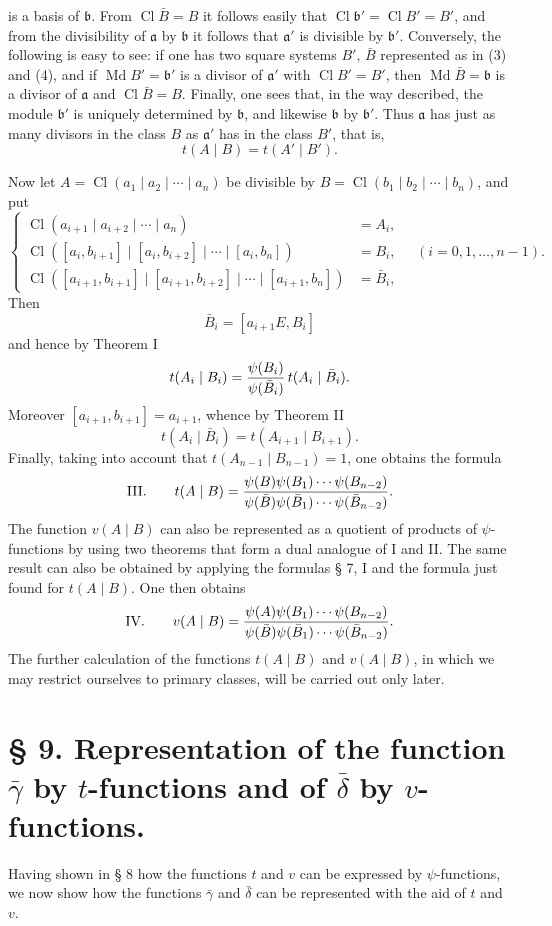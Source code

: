 \documentclass[11pt,a4paper]{article}
\newcommand{\Cl}{\operatorname{Cl}}
\newcommand{\Md}{\operatorname{Md}}
\begin{document}
is a basis of $\mathfrak b$. From $\Cl\bar B=B$ it follows easily that $\Cl\mathfrak b'=\Cl B'=B'$, and from the divisibility of $\mathfrak a$ by $\mathfrak b$ it follows that $\mathfrak a'$ is divisible by $\mathfrak b'$. Conversely, the following is easy to see: if one has two square systems $B'$, $\bar B$ represented as in (3) and (4), and if $\Md B'=\mathfrak b'$ is a divisor of $\mathfrak a'$ with $\Cl B'=B'$, then $\Md\bar B=\mathfrak b$ is a divisor of $\mathfrak a$ and $\Cl\bar B=B$. Finally, one sees that, in the way described, the module $\mathfrak b'$ is uniquely determined by $\mathfrak b$, and likewise $\mathfrak b$ by $\mathfrak b'$. Thus $\mathfrak a$ has just as many divisors in the class $B$ as $\mathfrak a'$ has in the class $B'$, that is,
\[
 t(A\mid B)=t(A'\mid B').
\]

Now let $A=\Cl(a_1\mid a_2\mid\cdots\mid a_n)$ be divisible by $B=\Cl(b_1\mid b_2\mid\cdots\mid b_n)$, and put
\begin{equation}
\left\{
\begin{aligned}
 \Cl(a_{i+1}\mid a_{i+2}\mid\cdots\mid a_n)&=A_i,\\
 \Cl([a_i,b_{i+1}]\mid[a_i,b_{i+2}]\mid\cdots\mid[a_i,b_n])&=B_i,\\
 \Cl([a_{i+1},b_{i+1}]\mid[a_{i+1},b_{i+2}]\mid\cdots\mid[a_{i+1},b_n])&=\bar B_i,
\end{aligned}
\right.
\quad (i=0,1,\ldots,n-1).
\tag{5}
\end{equation}
Then
\[
 \bar B_i=[a_{i+1}E,B_i]
\]
and hence by Theorem I
\[
 t(A_i\mid B_i)={\psi(B_i)\over\psi(\bar B_i)}\,t(A_i\mid\bar B_i).
\]
Moreover $[a_{i+1},b_{i+1}]=a_{i+1}$, whence by Theorem II
\[
 t(A_i\mid\bar B_i)=t(A_{i+1}\mid B_{i+1}).
\]
Finally, taking into account that $t(A_{n-1}\mid B_{n-1})=1$, one obtains the formula
\[
\text{III.}\qquad
 t(A\mid B)=
 {\psi(B)\psi(B_1)\cdots\psi(B_{n-2})
 \over
 \psi(\bar B)\psi(\bar B_1)\cdots\psi(\bar B_{n-2})}.
\]
The function $v(A\mid B)$ can also be represented as a quotient of products of $\psi$-functions by using two theorems that form a dual analogue of I and II. The same result can also be obtained by applying the formulas § 7, I and the formula just found for $t(A\mid B)$. One then obtains
\[
\text{IV.}\qquad
 v(A\mid B)=
 {\psi(A)\psi(B_1)\cdots\psi(B_{n-2})
 \over
 \psi(\bar B)\psi(\bar B_1)\cdots\psi(\bar B_{n-2})}.
\]
The further calculation of the functions $t(A\mid B)$ and $v(A\mid B)$, in which we may restrict ourselves to primary classes, will be carried out only later.

\section*{§ 9. Representation of the function $\bar\gamma$ by $t$-functions and of $\bar\delta$ by $v$-functions.}

Having shown in § 8 how the functions $t$ and $v$ can be expressed by $\psi$-functions, we now show how the functions $\bar\gamma$ and $\bar\delta$ can be represented with the aid of $t$ and $v$.
\end{document}
